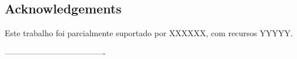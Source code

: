 \documentclass[a0,portrait]{a0poster}
\begin{document}
\begin{mdframed}[style=MyFrame]
\begin{multicols}{2}
\section*{Acknowledgements}
%
Este trabalho foi parcialmente suportado por XXXXXX, com recursos  YYYYY.

%
%

-------------------------------------
\end{multicols}
\begin{center}
\color{SteelBlue}{New Zealand Statistical Association 2024 Conference}
\end{center}
\end{mdframed}
\end{document}
